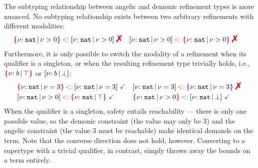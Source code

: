 The subtyping relationship between angelic and demonic refinement
types is more nuanced. No subtyping relationship exists between two
arbitrary refinements with different modalities: %
\vspace{-0.2em}
\begin{align*}
  &\ort{\Nat}{\vnu > 0} \subty \urt{\Nat}{\vnu > 0}\;\judgfail
  & &\urt{\Nat}{\vnu > 0} \subty \ort{\Nat}{\vnu > 0} \;\judgfail
\end{align*} %
\noindent
Furthermore, it is only possible to switch the modality of a
refinement when its qualifier is a singleton, or when the resulting
refinement type trivially holds, i.e., $\textcolor{magenta}{\mbox{\rm\textbf{\{}}} { {\nu}{:}\;{b}\, |\, {\top} } \textcolor{magenta}{\mbox{\rm\textbf{\}}}}$ or
$\urt{b}{\bot}$: %
\vspace{-0.2em}
\begin{align*}
  &\ort{\Nat}{\vnu = 3} \subty \urt{\Nat}{\vnu =
    3}\;\judgok
  & & \urt{\Nat}{\vnu = 3} \subty \ort{\Nat}{\vnu =
      3}\;\judgfail \\
  & \urt{\Nat}{\vnu > 0} \subty \ort{\Nat}{\top}\;\judgok
  & &\ort{\Nat}{\vnu > 0} \subty \urt{\Nat}{\bot}\;\judgok
\end{align*}\noindent
When the qualifier is a singleton, safety entails reachability ---
there is only one possible value, so the demonic constraint (the value
may only be 3) and the angelic constraint (the value 3 must be
reachable) make identical demands on the term. Note that the converse
direction does not hold, however. Converting to a supertype with a
trivial qualifier, in contrast, simply throws away the bounds on a
term entirely.

